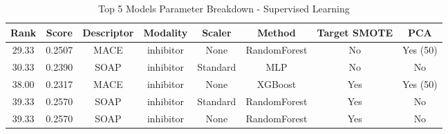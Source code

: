 \begin{table}[htbp]
\centering
\caption{Top 5 Models Parameter Breakdown - Supervised Learning}
\begin{tabular}{cccccccc}
\toprule
\textbf{Rank} & \textbf{Score} & \textbf{Descriptor} & \textbf{Modality} & \textbf{Scaler} & \textbf{Method} & \textbf{Target SMOTE} & \textbf{PCA} \\
\midrule
29.33 & 0.2507 & MACE & inhibitor & None & RandomForest & No & Yes (50) \\
30.33 & 0.2390 & SOAP & inhibitor & Standard & MLP & No & No \\
38.00 & 0.2317 & MACE & inhibitor & None & XGBoost & Yes & Yes (50) \\
39.33 & 0.2570 & SOAP & inhibitor & Standard & RandomForest & Yes & No \\
39.33 & 0.2570 & SOAP & inhibitor & None & RandomForest & Yes & No \\
\bottomrule
\end{tabular}
\label{tab:parameter_breakdown_supervised_learning}
\end{table}